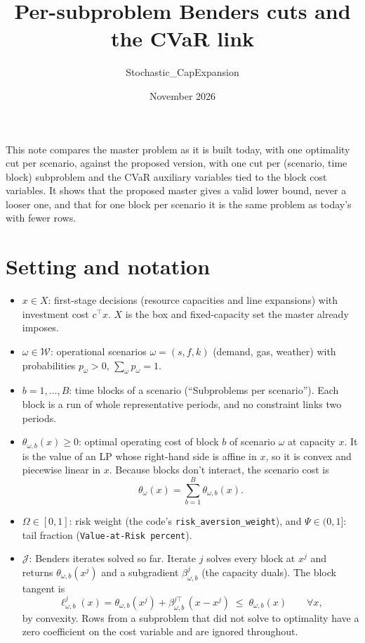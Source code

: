 \documentclass[11pt]{article}
\title{Per-subproblem Benders cuts and the CVaR link}
\author{Stochastic\_CapExpansion}
\date{November 2026}
\theoremstyle{remark}
\newcommand{\W}{\mathcal{W}}
\newcommand{\J}{\mathcal{J}}
\begin{document}
\maketitle

\noindent This note compares the master problem as it is built today, with one optimality cut per
scenario, against the proposed version, with one cut per (scenario, time block) subproblem and the
CVaR auxiliary variables tied to the block cost variables. It shows that the proposed master gives a
valid lower bound, never a looser one, and that for one block per scenario it is the same problem as
today's with fewer rows.

\section{Setting and notation}

\begin{itemize}[leftmargin=*]
  \item $x \in X$: first-stage decisions (resource capacities and line expansions) with investment
        cost $c^\top x$. $X$ is the box and fixed-capacity set the master already imposes.
  \item $\omega \in \W$: operational scenarios $\omega = (s,f,k)$ (demand, gas, weather) with
        probabilities $p_\omega > 0$, $\sum_{\omega} p_\omega = 1$.
  \item $b = 1,\dots,B$: time blocks of a scenario (``Subproblems per scenario''). Each block is a run
        of whole representative periods, and no constraint links two periods.
  \item $\theta_{\omega,b}(x) \ge 0$: optimal operating cost of block $b$ of scenario $\omega$ at
        capacity $x$. It is the value of an LP whose right-hand side is affine in $x$, so it is convex
        and piecewise linear in $x$. Because blocks don't interact, the scenario cost is
        \begin{equation}
          \theta_\omega(x) = \sum_{b=1}^{B} \theta_{\omega,b}(x).
        \end{equation}
  \item $\Omega \in [0,1]$: risk weight (the code's \texttt{risk\_aversion\_weight}), and
        $\Psi \in (0,1]$: tail fraction (\texttt{Value-at-Risk percent}).
  \item $\J$: Benders iterates solved so far. Iterate $j$ solves every block at $x^j$ and returns
        $\theta_{\omega,b}(x^j)$ and a subgradient $\beta^j_{\omega,b}$ (the capacity duals). The block
        tangent is
        \begin{equation}
          \ell^j_{\omega,b}(x) = \theta_{\omega,b}(x^j) + \beta^{j\top}_{\omega,b}\,(x - x^j)
          \;\le\; \theta_{\omega,b}(x) \qquad \forall x,
        \end{equation}
        by convexity. Rows from a subproblem that did not solve to optimality have a zero coefficient
        on the cost variable and are ignored throughout.
\end{itemize}
\end{document}

